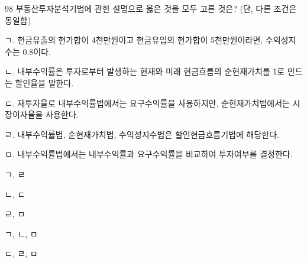 \begin{question}{98}
부동산투자분석기법에 관한 설명으로 옳은 것을 모두 고른 것은? (단, 다른 조건은 동일함)
\begin{framedtext}
ㄱ. 현금유출의 현가합이 4천만원이고 현금유입의 현가합이 5천만원이라면, 수익성지수는 0.8이다. \par
ㄴ. 내부수익률은 투자로부터 발생하는 현재와 미래 현금흐름의 순현재가치를 1로 만드는 할인율을 말한다. \par
ㄷ. 재투자율로 내부수익률법에서는 요구수익률을 사용하지만, 순현재가치법에서는 시장이자율을 사용한다. \par
ㄹ. 내부수익률법, 순현재가치법, 수익성지수법은 할인현금흐름기법에 해당한다. \par
ㅁ. 내부수익률법에서는 내부수익률과 요구수익률을 비교하여 투자여부를 결정한다. \par
\end{framedtext}
\begin{choices}
  \item ㄱ, ㄹ
  \item ㄴ, ㄷ
  \item ㄹ, ㅁ
  \item ㄱ, ㄴ, ㅁ
  \item ㄷ, ㄹ, ㅁ
\end{choices}
\end{question}

